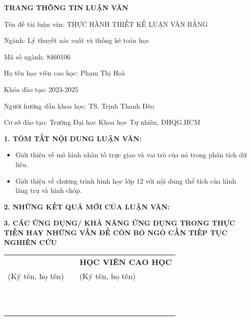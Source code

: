 \begin{titlepage}
\begin{center}
    {\bf TRANG THÔNG TIN LUẬN VĂN}
\end{center}
\author{}
\date{}

Tên đề tài luận văn: THỰC HÀNH THIẾT KẾ LUẬN VĂN BẰNG \LaTeXe

Ngành: Lý thuyết xác suất và thống kê toán học

Mã số ngành: 8460106

Họ tên học viên cao học: Phạm Thị Hoà

Khóa đào tạo: 2023-2025

Người hướng dẫn khoa học: TS. Trịnh Thanh Đèo

Cơ sở đào tạo: Trường Đại học Khoa học Tự nhiên, ĐHQG.HCM


{\bf 1. TÓM TẮT NỘI DUNG LUẬN VĂN:}
\begin{itemize}[label=-]
    \item Giới thiệu về mô hình nhân tố trực giao và vai trò của nó trong phân tích dữ liệu.
    \item Giới thiệu về chương trình hình học lớp 12 với nội dung thể tích của hình lăng trụ và hình chóp.
\end{itemize}


{\bf 2. NHỮNG KẾT QUẢ MỚI CỦA LUẬN VĂN:}

\vspace*{1cm}

{\bf 3. CÁC ỨNG DỤNG/ KHẢ NĂNG ỨNG DỤNG TRONG THỰC TIỄN HAY NHỮNG VẤN ĐỀ CÒN BỎ NGỎ CẦN TIẾP TỤC NGHIÊN CỨU}
\vspace*{1cm}

\begin{tabular}{>{\centering\arraybackslash}m{5cm} >{\centering\arraybackslash}m{5cm} >{\centering\arraybackslash}m{5cm}}
    {\bf TẬP THỂ CÁN BỘ HƯỚNG DẪN} & & {\bf HỌC VIÊN CAO HỌC} \\
    (Ký tên, họ tên) & & (Ký tên, họ tên) \\
    & & \\
    & & \\
    & & \\
    & & \\
    & & \\
    & & \\
    & & \\
    & & \\
    & & \\
    \multicolumn{3}{c}{\bf XÁC NHẬN CỦA CƠ SỞ ĐÀO TẠO} \\
    \multicolumn{3}{c}{\bf HIỆU TRƯỞNG} \\
\end{tabular}
\end{titlepage}